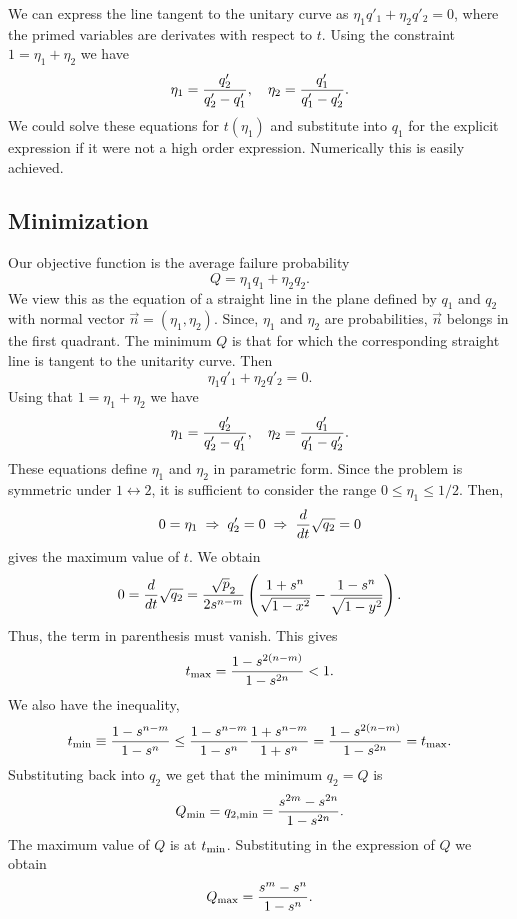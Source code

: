 \documentclass[aps,prl,twocolumn,eqsecnum,showpacs]{revtex4}
\begin{document}
We can express the line tangent to the unitary curve as $\eta_1 q'_1+\eta_2 q'_2=0$, where the primed variables are derivates with respect to $t$.  Using the constraint $1=\eta_1+\eta_2$ we have 
\begin{equation}
\eta_1={q'_2\over q'_2-q'_1},\quad \eta_2={q'_1\over q'_1-q'_2}.
\end{equation}
We could solve these equations for $t(\eta_1)$ and substitute into $q_1$ for the explicit expression if it were not a high order expression.  Numerically this is easily achieved.

\subsection{Minimization}

Our objective function is the average failure probability
$$
Q=\eta_1 q_1+\eta_2 q_2 .
$$
We view this as the equation of a straight line in the plane defined by $q_1$ and $q_2$ with normal vector $\vec n=(\eta_1,\eta_2)$. Since, $\eta_1$ and $\eta_2$ are probabilities, $\vec n$ belongs in the first quadrant. The minimum $Q$ is  that for which the corresponding straight line is tangent to the unitarity curve. Then
$$
\eta_1 q'_1+\eta_2 q'_2=0.
$$
Using that $1=\eta_1+\eta_2$ we have
$$
\eta_1={q'_2\over q'_2-q'_1},\quad \eta_2={q'_1\over q'_1-q'_2}.
$$
These equations define $\eta_1$ and $\eta_2$ in parametric form. 
Since the problem is symmetric under $1\leftrightarrow2$, it is sufficient to consider the range $0\le\eta_1\le 1/2$.
Then,
$$
0=\eta_1\;\Rightarrow\; q'_2=0\;\Rightarrow\; {d\over dt}\sqrt{q_2}=0
$$
gives the maximum value of $t$. We obtain
$$
0={d\over dt}\sqrt{q_2}={\sqrt p_2\over2s^{n-m}}\left({1+s^n\over\sqrt{1-x^2}}-{1-s^n\over\sqrt{1-y^2}}\right).
$$
Thus, the term in parenthesis must vanish. This gives
$$
t_{\rm max}={1-s^{2(n-m)}\over1-s^{2n}}<1.
$$
We also have the inequality,
$$
t_{\rm min}\equiv {1-s^{n-m}\over1-s^n}\le{1-s^{n-m}\over1-s^n}{1+s^{n-m}\over1+s^n}={1-s^{2(n-m)}\over1-s^{2n}}
=t_{\rm max} .
$$
Substituting back into $q_2$ we get that the minimum $q_2=Q$ is
$$
Q_{\rm min}=q_{2,{\rm min}}={s^{2m}-s^{2n}\over 1-s^{2n}}.
$$
The maximum value of $Q$ is at $t_{\rm min}$. Substituting in the expression of $Q$ we obtain
$$
Q_{\rm max}={s^m-s^n\over1-s^n}.
$$
\end{document}
